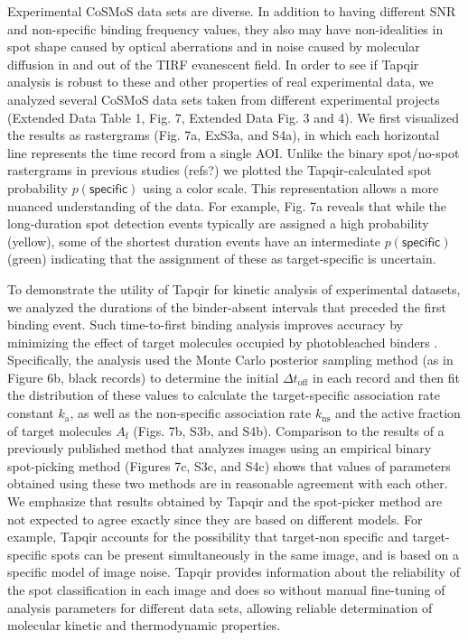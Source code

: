 Experimental CoSMoS data sets are diverse.  In addition to having different SNR and non-specific binding frequency values, they also may have non-idealities in spot shape caused by optical aberrations and in noise caused by molecular diffusion in and out of the TIRF evanescent field.  In order to see if Tapqir analysis is robust to these and other properties of real experimental data, we  analyzed several CoSMoS data sets taken from different experimental projects (Extended Data Table 1, Fig. 7, Extended Data Fig. 3 and 4). We first visualized the results as rastergrams (Fig. 7a, ExS3a, and S4a), in which each horizontal line represents the time record from a single AOI.  Unlike the binary spot/no-spot rastergrams in previous studies (refs?) we plotted the Tapqir-calculated spot probability $p(\mathsf{specific})$ using a color scale.  This representation allows a more nuanced understanding of the data.  For example, Fig. 7a reveals that while the long-duration spot detection events typically are assigned a high probability (yellow), some of the shortest duration events have an intermediate $p(\mathsf{specific})$ (green) indicating that the assignment of these as target-specific is uncertain.  

To demonstrate the utility of Tapqir for kinetic analysis of experimental datasets, we analyzed the durations of the binder-absent intervals that preceded the first binding event.  Such time-to-first binding analysis improves accuracy by minimizing the effect of target molecules occupied by photobleached binders \cite{Friedman2006-kb}.  Specifically, the analysis used the Monte Carlo posterior sampling method (as in Figure 6b, black records) to determine the initial  $\Delta t_\mathrm{off}$ in each record and then fit the distribution of these values to calculate the target-specific association rate constant $k_\mathrm{a}$, as well as the non-specific association rate $k_\mathrm{ns}$ and the active fraction of target molecules $A_\mathrm{f}$ (Figs. 7b, S3b, and S4b). Comparison to the results of a previously published method that analyzes images using an empirical binary spot-picking method \cite{Friedman2006-kb} (Figures 7c, S3c, and S4c) shows that values of parameters obtained using these two methods are in reasonable agreement with each other. We emphasize that results obtained by Tapqir and the spot-picker method are not expected to agree exactly since they are based on different models.  For example, Tapqir accounts for the possibility that target-non specific and target-specific spots can be present simultaneously in the same image, and is based on a specific model of image noise.  Tapqir provides information about the reliability of the spot classification in each image and does so without manual fine-tuning of analysis parameters for different data sets, allowing reliable determination of molecular kinetic and thermodynamic properties.

